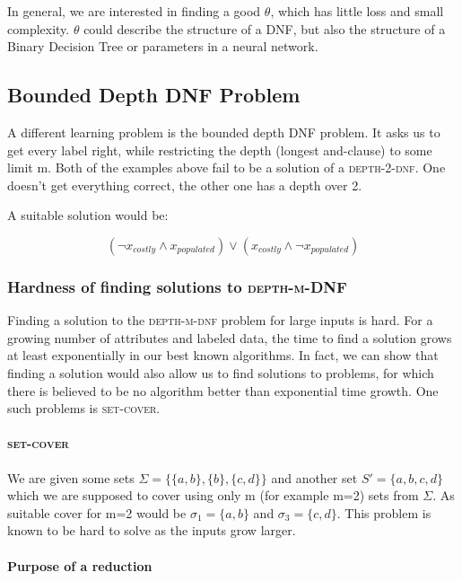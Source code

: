 \documentclass{article}
\begin{document}
In general, we are interested in finding a good $\theta$, which has little loss and small complexity. $\theta$ could describe the structure of a DNF, but also the structure of a Binary Decision Tree or parameters in a neural network.

\subsection{Bounded Depth DNF Problem}

A different learning problem is the bounded depth DNF problem. It asks us to get every label right, while restricting the depth (longest and-clause) to some limit m.
Both of the examples above fail to be a solution of a \textsc{depth-2-dnf}. One doesn't get everything correct, the other one has a depth over 2.

A suitable solution would be:

\begin{equation*}
    (\lnot x_{costly} \land x_{populated}) \lor
    (x_{costly} \land \lnot x_{populated})
\end{equation*}

\subsubsection{Hardness of finding solutions to \textsc{depth-m-DNF}}
Finding a solution to the \textsc{depth-m-dnf} problem for large inputs is hard. For a growing number of attributes and labeled data, the time to find a solution grows at least exponentially in our best known algorithms. In fact, we can show that finding a solution would also allow us to find solutions to problems, for which there is believed to be no algorithm better than exponential time growth. One such problems is \textsc{set-cover}.

\paragraph{\textsc{set-cover}}

We are given some sets $\Sigma = \{\{a, b\}, \{b\}, \{c, d\}\}$ and another set $S' = \{a, b, c, d\}$ which we are supposed to cover using only m (for example m=2) sets from $\Sigma$. As suitable cover for m=2 would be $\sigma_1 = \{a, b\}$ and $\sigma_3 = \{c, d\}$. This problem is known to be hard to solve as the inputs grow larger.

\paragraph{Purpose of a reduction}
\end{document}
